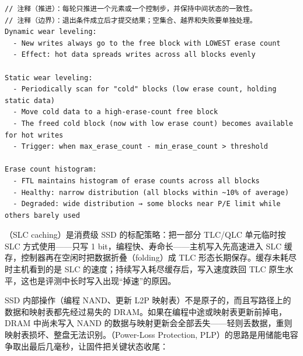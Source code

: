 \begin{lstlisting}
// 注释（推进）：每轮只推进一个元素或一个控制步，并保持中间状态的一致性。
// 注释（边界）：退出条件成立后才提交结果；空集合、越界和失败要单独处理。
Dynamic wear leveling:
  - New writes always go to the free block with LOWEST erase count
  - Effect: hot data spreads writes across all blocks evenly

Static wear leveling:
  - Periodically scan for "cold" blocks (low erase count, holding static data)
  - Move cold data to a high-erase-count free block
  - The freed cold block (now with low erase count) becomes available for hot writes
  - Trigger: when max_erase_count - min_erase_count > threshold

Erase count histogram:
  - FTL maintains histogram of erase counts across all blocks
  - Healthy: narrow distribution (all blocks within ~10% of average)
  - Degraded: wide distribution → some blocks near P/E limit while others barely used
\end{lstlisting}


（SLC caching）是消费级 SSD 的标配策略：把一部分 TLC/QLC 单元临时按 SLC 方式使用——只写 1 bit，编程快、寿命长——主机写入先高速进入 SLC 缓存，控制器再在空闲时把数据折叠（folding）成 TLC 形态长期保存。缓存未耗尽时主机看到的是 SLC 的速度；持续写入耗尽缓存后，写入速度跌回 TLC 原生水平，这也是评测中长时写入出现“掉速”的原因。


SSD 内部操作（编程 NAND、更新 L2P 映射表）不是原子的，而且写路径上的数据和映射表都先经过易失的 DRAM。如果在编程中途或映射表更新前掉电，DRAM 中尚未写入 NAND 的数据与映射更新会全部丢失——轻则丢数据，重则映射表损坏、整盘无法识别。（Power-Loss Protection, PLP）的思路是用储能电容争取出最后几毫秒，让固件把关键状态收尾：

